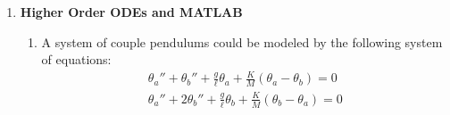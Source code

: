 \documentclass[letterpaper, fontsize=12pt]{scrartcl} %
\numberwithin{equation}{section} %
\numberwithin{figure}{section} %
\numberwithin{table}{section} %
\begin{document}
\begin{enumerate}
%
%

\clearpage
\item \textbf{Higher Order ODEs and MATLAB}
\begin{enumerate}
\item A system of couple pendulums could be modeled by the following system of equations: 
\begin{gather*}
\theta_a'' + \theta_b'' + \frac{g}{\ell}\theta_a + \frac{K}{M}(\theta_a - \theta_b) = 0 \tag{1}\\
\theta_a'' + 2 \theta_b'' + \frac{g}{\ell}\theta_b + \frac{K}{M}(\theta_b - \theta_a) = 0 \tag{2}
\end{gather*}



\end{enumerate}
\end{enumerate}
\end{document}

